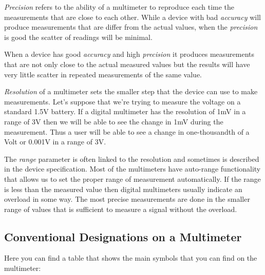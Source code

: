 \documentclass[../main.tex]{subfiles}
\begin{document}
\emph{Precision} refers to the ability of a multimeter to reproduce each time
the measurements that are close to each other.  While a device with bad
\emph{accuracy} will produce measurements that are differ from the actual
values, when the \emph{precision} is good the scatter of readings will be
minimal.

When a device has good \emph{accuracy} and high \emph{precision} it produces
measurements that are not only close to the actual measured values but the
results will have very little scatter in repeated measurements of the same
value.

\emph{Resolution} of a multimeter sets the smaller step that the device can use
to make measurements.  Let's suppose that we're trying to measure the voltage on
a standard 1.5V battery.  If a digital multimeter has the resolution of 1mV in a
range of 3V then we will be able to see the change in 1mV during the
measurement.  Thus a user will be able to see a change in one-thousandth of a
Volt or 0.001V in a range of 3V.

The \emph{range} parameter is often linked to the resolution and sometimes is
described in the device specification.  Most of the multimeters have auto-range
functionality that allows us to set the proper range of measurement
automatically.  If the range is less than the measured value then digital
multimeters usually indicate an overload in some way.  The most precise
measurements are done in the smaller range of values that is sufficient to
measure a signal without the overload.

\subsection{Conventional Designations on a Multimeter}

Here you can find a table that shows the main symbols that you can find on the
multimeter:
\end{document}
